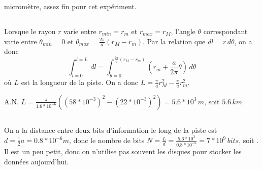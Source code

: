 \documentclass[a4paper,12pt]{book}
\begin{document}
micromètre, assez fin pour cet expériment.
\subsection{}
Lorsque le rayon $r$ varie entre $r_{min}=r_m$ et $r_{max}=r_M$, l'angle $\theta$ correspondant varie 
entre $\theta_{min}=0$ et $\theta_{max}=\frac{2\pi}{a}(r_M-r_m)$. Par la relation que $dl=r\,d\theta$, 
on a donc 
$$
\int_{l=0}^{l=L}\,dl=\int_{\theta=0}^{\frac{2\pi}{a}(r_M-r_m)} \left(r_m+\frac{a}{2\pi}\theta\right)\,d\theta
$$
où $L$ est la longueur de la piste. 
On a donc $L=\boxed{\frac{\pi}{a}r_M^2-\frac{\pi}{a}r_m^2}$. 

\hspace*{\fill} 

A.N. $\boxed{L=\frac{\pi}{1.6*10^{-6}}((58*10^{-3})^2-(22*10^{-3})^2)=5.6*10^3\,m}$, soit $5.6\,km$ 



\subsection{}
On a la distance entre deux bits d'information le long de la piste est $d=\frac{1}{2}a=0.8*10^{-6}m$, 
donc le nombre de bits $N=\frac{L}{d}=\frac{5.6*10^3}{0.8*10^{-6}}=7*10^{9}\,bits$, soit .
Il est un peu petit, donc on n'utilise pas souvent les disques pour stocker les données aujourd'hui. 
\end{document}
